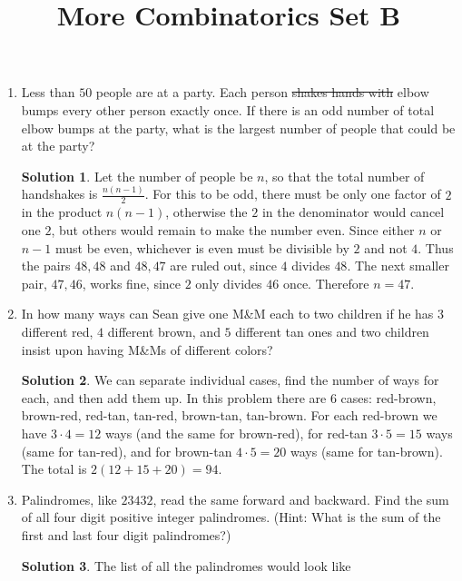 \documentclass[twocolumn]{article}
\title{More Combinatorics Set B}
\author{}
\date{}
\theoremstyle{definition}
\newtheorem*{solution}{Solution}
\begin{document}
\maketitle
\begin{enumerate}
    \item Less than $50$ people are at a party.
        Each person \sout{shakes hands with} elbow bumps every other person exactly once.
        If there is an odd number of total elbow bumps at the party,
        what is the largest number of people that could be at the party?
        \begin{solution}
            Let the number of people be $n$,
            so that the total number of handshakes is $\frac{n(n - 1)}{2}$.
            For this to be odd, there must be only one factor of $2$ in the product $n(n - 1)$,
            otherwise the $2$ in the denominator would cancel one $2$,
            but others would remain to make the number even.
            Since either $n$ or $n - 1$ must be even,
            whichever is even must be divisible by $2$ and not $4$.
            Thus the pairs $48, 48$ and $48, 47$ are ruled out, since $4$ divides $48$.
            The next smaller pair, $47, 46$, works fine, since $2$ only divides $46$ once.
            Therefore $n = 47$.
        \end{solution}
    \item In how many ways can Sean give one M\&M each to two children
        if he has $3$ different red, $4$ different brown, and $5$ different tan ones
        and two children insist upon having M\&Ms of different colors?
        \begin{solution}
            We can separate individual cases, find the number of ways for each,
            and then add them up.
            In this problem there are $6$ cases:
            red-brown, brown-red, red-tan, tan-red, brown-tan, tan-brown.
            For each red-brown we have $3 \cdot 4 = 12$ ways (and the same for brown-red),
            for red-tan $3 \cdot 5 = 15$ ways (same for tan-red),
            and for brown-tan $4 \cdot 5 = 20$ ways (same for tan-brown).
            The total is $2(12 + 15 + 20) = 94$.
        \end{solution}
    \item Palindromes, like $23432$, read the same forward and backward.
        Find the sum of all four digit positive integer palindromes.
        (Hint: What is the sum of the first and last four digit palindromes?)
        \begin{solution}
            The list of all the palindromes would look like

\end{solution}
\end{enumerate}
\end{document}

